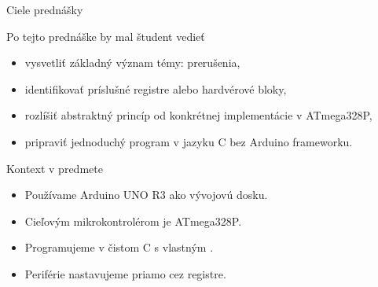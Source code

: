 
\begin{frame}{Ciele prednášky}
\begin{tukebox}{Po tejto prednáške by mal študent vedieť}
\begin{itemize}
    \item vysvetliť základný význam témy: prerušenia,
    \item identifikovať príslušné registre alebo hardvérové bloky,
    \item rozlíšiť abstraktný princíp od konkrétnej implementácie v ATmega328P,
    \item pripraviť jednoduchý program v jazyku C bez Arduino frameworku.
\end{itemize}
\end{tukebox}
\end{frame}

\begin{frame}{Kontext v predmete}
\begin{itemize}
    \item Používame Arduino UNO R3 ako vývojovú dosku.
    \item Cieľovým mikrokontrolérom je ATmega328P.
    \item Programujeme v čistom C s vlastným .
    \item Periférie nastavujeme priamo cez registre.
\end{itemize}
\end{frame}

